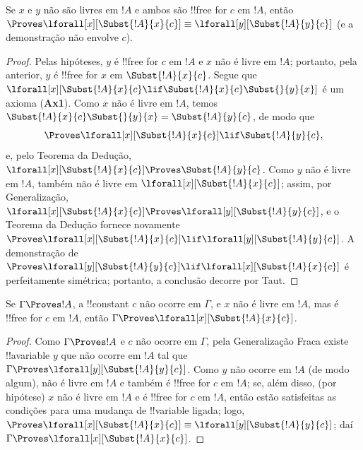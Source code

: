 \documentclass[../../../include/open-logic-section]{subfiles}
\begin{document}
\begin{lem}
Se $x$ e $y$ não são livres em $!A$ e ambos são !!{free for} $c$
em $!A$, então $\Proves \lforall[x][\Subst{!A}{x}{c}] \equiv
\lforall[y][\Subst{!A}{y}{c}]$ (e a demonstração não envolve $c$).
\end{lem}

\begin{proof} 
Pelas hipóteses, $y$ é !!{free for} $c$ em $!A$ e $x$ não é
livre em $!A$; portanto, pela  anterior, $y$ é
!!{free for} $x$ em $\Subst{!A}{x}{c}$. Segue que
$\lforall[x][\Subst{!A}{x}{c} \lif \Subst{!A}{x}{c} \Subst{}{y}{x}]$
é um axioma (\textbf{Ax1}). Como $x$ não é livre em $!A$, temos
$\Subst{!A}{x}{c} \Subst{}{y}{x} = \Subst{!A}{y}{c}$, de modo que 
\[
\Proves \lforall[x][\Subst{!A}{x}{c}] \lif \Subst{!A}{y}{c}, 
\] 
e, pelo Teorema da Dedução, $\lforall[x][\Subst{!A}{x}{c}] \Proves
\Subst{!A}{y}{c}$. Como $y$ não é livre em $!A$, também não é livre em
$\lforall[x][\Subst{!A}{x}{c}]$; assim, por Generalização,
$\lforall[x][\Subst{!A}{x}{c}] \Proves \lforall[y][\Subst{!A}{y}{c}]$,
e o Teorema da Dedução fornece novamente $\Proves
\lforall[x][\Subst{!A}{x}{c}] \lif \lforall[y][\Subst{!A}{y}{c}]$.
A demonstração de $\Proves \lforall[y][\Subst{!A}{y}{c}] \lif \lforall[x]
[\Subst{!A}{x}{c}]$ é perfeitamente simétrica; portanto, a conclusão
decorre por Taut.
\end{proof}

\begin{thm}
Se $\Gamma \Proves !A$, a !!{constant} $c$ não ocorre em
$\Gamma$, e $x$ não é livre em $!A$, mas é !!{free for} $c$ em $!A$,
então $\Gamma \Proves \lforall[x][\Subst{!A}{x}{c}]$. 
\end{thm}

\begin{proof} 
Como $\Gamma \Proves !A$ e $c$ não ocorre em $\Gamma$, pela
Generalização Fraca existe !!a{variable} $y$ que não ocorre em $!A$ tal que
$\Gamma \Proves \lforall[y][\Subst{!A}{y}{c}]$. Como $y$ não ocorre em $!A$
(de modo algum), não é livre em $!A$ e também é !!{free for} $c$ em $!A$;
se, além disso, (por hipótese) $x$ não é livre em $!A$ e é !!{free for} $c$ em
$!A$, então estão satisfeitas as condições para uma mudança de !!{variable} ligada; logo,
$\Proves \lforall[x][\Subst{!A}{x}{c}] \equiv
\lforall[y][\Subst{!A}{y}{c}]$; daí $\Gamma \Proves
\lforall[x][\Subst{!A}{x}{c}]$. 
\end{proof}
\end{document}
